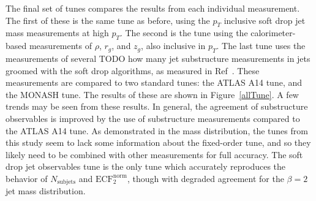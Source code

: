 The final set of tunes compares the results from each individual measurement. The first of these is the same tune as before, using the $p_T$ inclusive soft drop jet mass measurements at high $p_T$.
The second is the tune using the calorimeter-based measurements of $\rho$, $r_g$, and $z_g$, also inclusive in $p_T$. 
The last tune uses the measurements of several TODO how many jet substructure measurements in jets groomed with the soft drop algorithms, as measured in Ref~\cite{jssObservables}.
These measurements are compared to two standard tunes: the ATLAS A14 tune, and the MONASH tune.
The results of these are shown in Figure~\ref{allTune}. 
A few trends may be seen from these results. In general, the agreement of substructure observables is improved by the use of substructure measurements compared to the ATLAS A14 tune.
As demonstrated in the mass distribution, the tunes from this study seem to lack some information about the fixed-order tune, 
and so they likely need to be combined with other measurements for full accuracy. 
The soft drop jet observables tune is the only tune which accurately reproduces the behavior of $N_{\mathrm{subjets}}$ and $\mathrm{ECF}_2^{\mathrm{norm}}$, though with
degraded agreement for the $\beta=2$ jet mass distribution.




